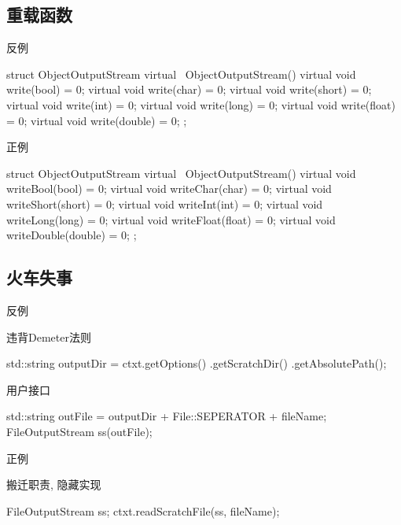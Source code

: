 \subsection{重载函数}

\begin{frame}[fragile]{反例}
\begin{c++}
struct ObjectOutputStream {
  virtual ~ObjectOutputStream() {}
  virtual void write(bool) = 0;
  virtual void write(char) = 0;
  virtual void write(short) = 0;
  virtual void write(int) = 0;
  virtual void write(long) = 0;
  virtual void write(float) = 0;
  virtual void write(double) = 0;
};
\end{c++}
\end{frame}

\begin{frame}[fragile]{正例}
\begin{c++}
struct ObjectOutputStream {
  virtual ~ObjectOutputStream() {}
  virtual void writeBool(bool) = 0;
  virtual void writeChar(char) = 0;
  virtual void writeShort(short) = 0;
  virtual void writeInt(int) = 0;
  virtual void writeLong(long) = 0;
  virtual void writeFloat(float) = 0;
  virtual void writeDouble(double) = 0;
};
\end{c++}
\end{frame}

\subsection{火车失事}

\begin{frame}[fragile]{反例}
\begin{block}{违背Demeter法则}
\begin{c++}
std::string outputDir = ctxt.getOptions()
  .getScratchDir()
  .getAbsolutePath();
\end{c++}
\end{block}

\begin{block}{用户接口}
\begin{c++}
std::string outFile = outputDir + File::SEPERATOR + fileName;
FileOutputStream ss(outFile);
\end{c++}
\end{block}
\end{frame}

\begin{frame}[fragile]{正例}
\begin{block}{搬迁职责, 隐藏实现}
\begin{c++}
FileOutputStream ss;
ctxt.readScratchFile(ss, fileName);
\end{c++}
\end{block}
\end{frame}

